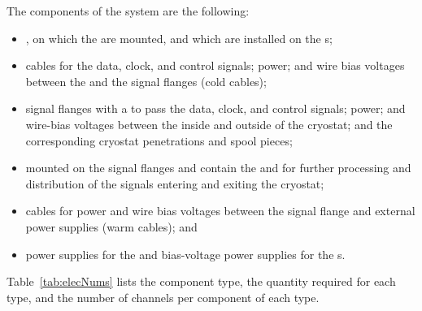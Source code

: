 The components of the  system are the following:
\begin{itemize}
\item{, on which the  are mounted, and which are installed on the s;}
\item{cables for the data, clock, and control signals;  power; and wire bias voltages between the  and the signal flanges (cold cables);}
\item{signal flanges with a  \fdth to pass the data, clock, and control signals;  power; and  wire-bias voltages between the inside and outside of the cryostat; and the corresponding cryostat penetrations and spool pieces;}
\item{%
 mounted on the signal flanges and contain
the %
 and %
 for further processing
and distribution of the signals entering and exiting the cryostat;}
\item{cables for  power and wire bias voltages between the signal flange and external power
supplies (warm cables); and}
\item{ power supplies for the  and bias-voltage power supplies for the s.}
\end{itemize}

Table~\ref{tab:elecNums} lists the component type, the quantity required for each type, and the number of channels per component of each type.

